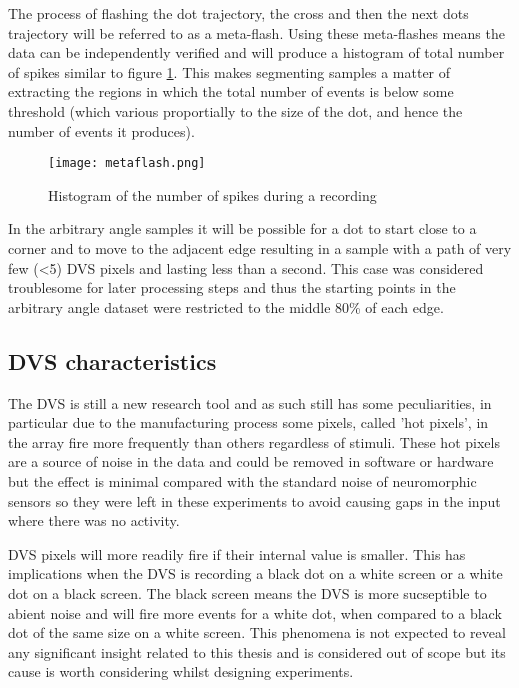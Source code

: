 The process of flashing the dot trajectory, the cross and then the next dots trajectory will be referred to as a meta-flash. 
Using these meta-flashes means the data can be independently verified and will produce a histogram of total number of spikes similar to figure \ref{fig:spikehistogram}.
This makes segmenting samples a matter of extracting the regions in which the total number of events is below some threshold (which various proportially to the size of the dot, and hence the number of events it produces). 

\begin{figure}
    \centering
    \texttt{[image: metaflash.png]}
    \caption{Histogram of the number of spikes during a recording}
    \label{fig:spikehistogram}
\end{figure}



In the arbitrary angle samples it will be possible for a dot to start close to a corner and to move to the adjacent edge resulting in a sample with a path of very few (\textless 5) DVS pixels and lasting less than a second.
This case was considered troublesome for later processing steps and thus the starting points in the arbitrary angle dataset were restricted to the middle 80\% of each edge. 

\subsection{DVS characteristics}

The DVS is still a new research tool and as such still has some peculiarities, in particular due to the manufacturing process some pixels, called 'hot pixels', in the array fire more frequently than others regardless of stimuli. 
These hot pixels are a source of noise in the data and could be removed in software or hardware but the effect is minimal compared with the standard noise of neuromorphic sensors so they were left in these experiments to avoid causing gaps in the input where there was no activity. 

DVS pixels will more readily fire if their internal value is smaller.
This has implications when the DVS is recording a black dot on a white screen or a white dot on a black screen.
The black screen means the DVS is more sucseptible to abient noise and will fire more events for a white dot, when compared to a black dot of the same size on a white screen. 
This phenomena is not expected to reveal any significant insight related to this thesis and is considered out of scope but its cause is worth considering whilst designing experiments. 



